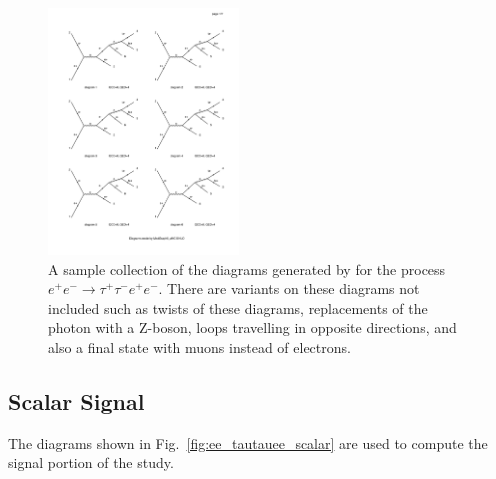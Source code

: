 \begin{figure}[h]
    \includegraphics[width=0.45\textwidth,clip=true,viewport=400 220 600 340,page=6]{Figures/madgraph_diagrams/ee_tautauee_background.pdf}
    \caption[A sample collection of the diagrams generated by \madgraph for the process $e^+ e^- \rightarrow \tau^+ \tau^- e^+ e^-$.]{A sample collection of the diagrams generated by \madgraph for the process $e^+ e^- \rightarrow \tau^+ \tau^- e^+ e^-$. There are variants on these diagrams not included such as twists of these diagrams, replacements of the photon with a Z-boson, loops travelling in opposite directions, and also a final state with muons instead of electrons.}
    \label{fig:ee_tautauee_background}
\end{figure}

\subsection{Scalar Signal}
The diagrams shown in Fig.\ \ref{fig:ee_tautauee_scalar} are used to compute the signal portion of the study.

